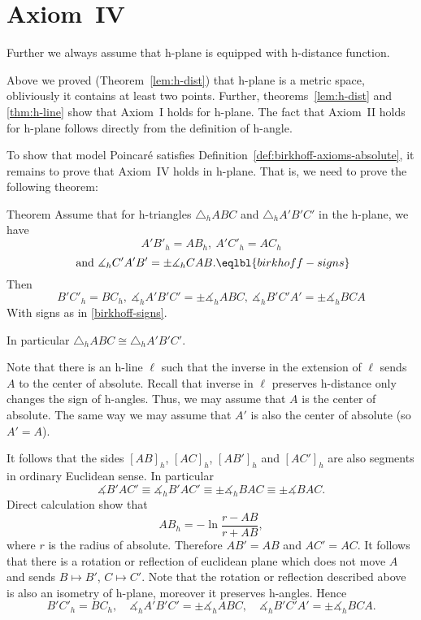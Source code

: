 {\section*{Axiom~IV}

Further we always assume that h-plane is equipped with h-distance function.

Above we proved (Theorem~\ref{lem:h-dist}) that h-plane is a metric space, obliviously it contains at least two points.
Further, theorems~\ref{lem:h-dist} and \ref{thm:h-line} show that Axiom~I holds for h-plane.
The fact that Axiom~II holds for h-plane follows directly from the definition of h-angle.

To show that model Poincar\'e satisfies Definition~\ref{def:birkhoff-axioms-absolute},
it remains to prove that Axiom~IV holds in h-plane.
That is, we need to prove the following theorem:

\begin{thm}{Theorem}
Assume that for h-triangles $\triangle_h A B C$ and $\triangle_h A' B' C'$ in the h-plane, we have
$$A' B'_h= A B_h,
\ A' C'_h= A C_h$$
$$\ \text{and}\ 
\measuredangle_h C' A' B'=\pm\measuredangle_h C A B.\eqlbl{birkhoff-signs}$$
Then 
$$ B' C'_h= B C_h,
\ \measuredangle_h A' B' C'=\pm\measuredangle_h A B C,
\ \measuredangle_h B' C' A'=\pm\measuredangle_h B  C A $$
With signs as in \ref{birkhoff-signs}.

In particular $\triangle_h A B C\cong\triangle_h A' B' C'$.
\end{thm}


Note that there is an h-line $\ell$ such that the inverse in the extension of $\ell$ sends $A$ to the center of absolute.
Recall that inverse in $\ell$ preserves h-distance only changes the sign of h-angles.%
Thus, we may assume that $A$ is the center of absolute.
The same way we may assume that $A'$ is also the center of absolute (so $A'=A$).

It follows that the sides $[AB]_h$, $[AC]_h$, $[AB']_h$ and $[AC']_h$ are also segments in ordinary Euclidean sense.
In particular 
$$\measuredangle B'AC'\equiv\measuredangle_h B'AC'\equiv\pm\measuredangle_h BAC\equiv\pm\measuredangle BAC.$$
Direct calculation show that 
$$AB_h=-\ln\frac{r-AB}{r+AB},$$
where $r$ is the radius of absolute.
Therefore $A B'=AB$ and $A C'=AC$.
It follows that there is a rotation or reflection of euclidean plane which does not move $A$ and sends $B\mapsto B'$, $C\mapsto C'$.
Note that the rotation or reflection described above is also an isometry of h-plane,
moreover it preserves h-angles.
Hence   
$$ B' C'_h= B C_h,
\quad
\measuredangle_h A' B' C'
=
\pm\measuredangle_h A B C,
\quad
\measuredangle_h B' C' A'
=
\pm\measuredangle_h B  C A.
$$
\qedsf













}
